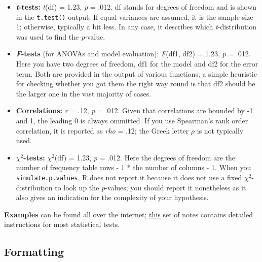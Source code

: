 \documentclass[
]{book}
\providecommand{\tightlist}{%
  \setlength{\itemsep}{0pt}\setlength{\parskip}{0pt}}
\begin{document}
\begin{itemize}
\tightlist
\item
  \textbf{\emph{t}-tests:} \emph{t}(df) = 1.23, \emph{p} = .012. df stands for degrees of freedom and is shown in the \texttt{t.test()}-output. If equal variances are assumed, it is the sample size - 1; otherwise, typically a bit less. In any case, it describes which \emph{t}-distribution was used to find the \emph{p}-value.
\item
  \textbf{\emph{F}-tests} (for ANOVAs and model evaluation): \emph{F}(df1, df2) = 1.23, \emph{p} = .012. Here you have two degrees of freedom, df1 for the model and df2 for the error term. Both are provided in the output of various functions; a simple heuristic for checking whether you got them the right way round is that df2 should be the larger one in the vast majority of cases.
\item
  \textbf{Correlations:} \emph{r} = .12, \emph{p} = .012. Given that correlations are bounded by -1 and 1, the leading 0 is always ommitted. If you use Spearman's rank order correlation, it is reported as \emph{rho} = .12; the Greek letter \(\rho\) is not typically used.
\item
  \textbf{\(\chi^2\)-tests:} \(\chi^2\)(df) = 1.23, \emph{p} = .012. Here the degrees of freedom are the number of frequency table rows - 1 * the number of columns - 1. When you \texttt{simulate.p.values}, R does not report it because it does not use a fixed \(\chi^2\)-distribution to look up the \emph{p}-values; you should report it nonetheless as it also gives an indication for the complexity of your hypothesis.
\end{itemize}

\textbf{Examples} can be found all over the internet; \href{http://ich.vscht.cz/~svozil/lectures/vscht/2015_2016/sad/APA_style2.pdf}{this} set of notes contains detailed instructions for most statistical tests.

\hypertarget{formatting}{%
\subsection{Formatting}\label{formatting}}
\end{document}
